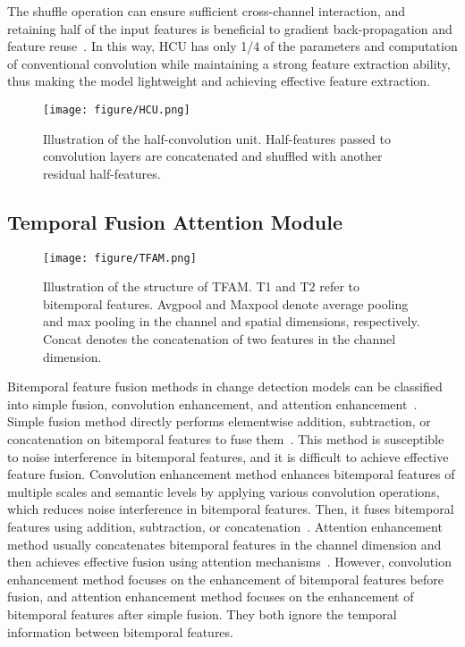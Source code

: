 \documentclass[journal]{IEEEtran}
\begin{document}
The shuffle operation can ensure sufficient cross-channel interaction, and retaining half of the input features is beneficial to gradient back-propagation and feature reuse~\cite{shuffle_v2}. In this way, HCU has only 1/4 of the parameters and computation of conventional convolution while maintaining a strong feature extraction ability, thus making the model lightweight and achieving effective feature extraction.

\begin{figure}[!ht]
 \centering
 \texttt{[image: figure/HCU.png]}
 \caption{Illustration of the half-convolution unit. Half-features passed to convolution layers are concatenated and shuffled with another residual half-features.}
 \label{Fig:HCU}
\end{figure}


\subsection{Temporal Fusion Attention Module}
\label{section:3.4}

\begin{figure*}[!ht]
	\centering
		\texttt{[image: figure/TFAM.png]}
	\caption{Illustration of the structure of TFAM. T1 and T2 refer to bitemporal features. Avgpool and Maxpool denote average pooling and max pooling in the channel and spatial dimensions, respectively. Concat denotes the concatenation of two features in the channel dimension.}
 \label{Fig:TFAM}
\end{figure*}

Bitemporal feature fusion methods in change detection models can be classified into simple fusion, convolution enhancement, and attention enhancement~\cite{fcef, snu,fccdn, dsifn, olcd}. Simple fusion method directly performs elementwise addition, subtraction, or concatenation on bitemporal features to fuse them~\cite{fcef, snu}. This method is susceptible to noise interference in bitemporal features, and it is difficult to achieve effective feature fusion. Convolution enhancement method enhances bitemporal features of multiple scales and semantic levels by applying various convolution operations, which reduces noise interference in bitemporal features. Then, it fuses bitemporal features using addition, subtraction, or concatenation~\cite{fccdn}. Attention enhancement method usually concatenates bitemporal features in the channel dimension and then achieves effective fusion using attention mechanisms~\cite{dsifn, olcd}. However, convolution enhancement method focuses on the enhancement of bitemporal features before fusion, and attention enhancement method focuses on the enhancement of bitemporal features after simple fusion. They both ignore the temporal information between bitemporal features.
\end{document}
